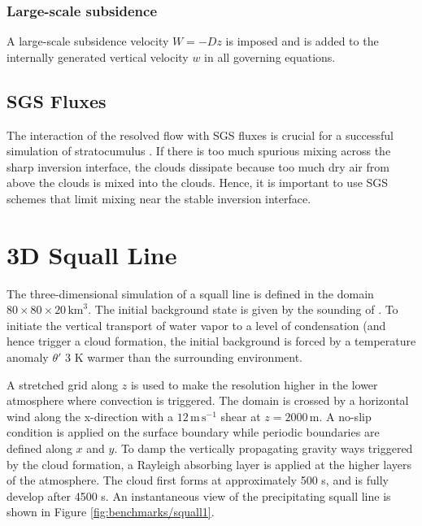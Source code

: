 \documentclass{report}
\begin{document}
{\subsubsection{Large-scale subsidence}

A large-scale subsidence velocity $W=-Dz$ is imposed and is added to the internally generated vertical velocity $w$ in all governing equations. 

\subsection{SGS Fluxes}

The interaction of the resolved flow with SGS fluxes is crucial for a successful simulation of stratocumulus \citep{Pressel17a}. If there is too much spurious mixing across the sharp inversion interface, the clouds dissipate because too much dry air from above the clouds is mixed into the clouds. Hence, it is important to use SGS schemes that limit mixing near the stable inversion interface.

\section{3D Squall Line}
\label{sq3D}
The three-dimensional simulation of a squall line is defined in the domain 
$80\times 80\times20\,\mathrm{km}^3$. 
The initial background state is given by the sounding of \cite{gabersekGiraldoDoyle2012}.
To initiate the vertical transport of water vapor to a level of condensation (and hence trigger a cloud formation, the initial background is forced by a temperature anomaly $\theta'$ $3$ K warmer than the surrounding environment. 

A stretched grid along $z$ is used to make the resolution higher in the lower atmosphere where convection is triggered.
The domain is crossed by a horizontal wind along the x-direction with a $12\,\mathrm{m\,s^{-1}}$ shear at $z=2000\,\mathrm{m}$.
A no-slip condition is applied on the surface boundary while periodic boundaries are defined along $x$ and $y$. 
To damp the vertically propagating gravity ways triggered by the cloud formation, a Rayleigh absorbing layer is applied at the higher layers of the atmosphere.
The cloud first forms at approximately 500 s, and is fully develop after 4500 s. 
An instantaneous view of the precipitating squall line is shown in Figure \ref{fig:benchmarks/squall1}. 

}
\end{document}
